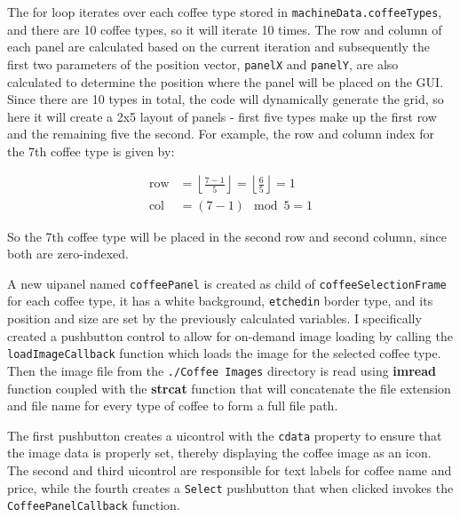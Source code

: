 \documentclass[a4paper, 11pt]{article}
\begin{document}
\noindent The for loop iterates over each coffee type stored in \texttt{machineData.coffeeTypes}, and there are 10 coffee types, so it will iterate 10 times. The row and column of each panel are calculated based on the current iteration and subsequently the first two parameters of the position vector, \texttt{panelX} and \texttt{panelY}, are also calculated to determine the position where the panel will be placed on the GUI. Since there are 10 types in total, the code will dynamically generate the grid, so here it will create a 2x5 layout of panels - first five types make up the first row and the remaining five the second. For example, the row and column index for the 7th coffee type is given by:

\begin{align*}
\text{row} & = \left\lfloor \frac{7 - 1}{5} \right\rfloor = \left\lfloor \frac{6}{5} \right\rfloor = 1 \\
\text{col} & = (7 - 1) \mod 5 = 1
\end{align*}

\noindent So the 7th coffee type will be placed in the second row and second column, since both are zero-indexed.
\vspace{5mm}

\noindent A new uipanel named \texttt{coffeePanel} is created as child of \texttt{coffeeSelectionFrame} for each coffee type, it has a white background, \texttt{etchedin} border type, and its position and size are set by the previously calculated variables.
I specifically created a pushbutton control to allow for on-demand image loading by calling the \texttt{loadImageCallback} function which loads the image for the selected coffee type. Then the image file from the \texttt{./Coffee Images} directory is read using \textbf{imread} function coupled with the \textbf{strcat} function that will concatenate the file extension and file name for every type of coffee to form a full file path.
\vspace{5mm}

\noindent The first pushbutton creates a uicontrol with the \texttt{cdata} property to ensure that the image data is properly set, thereby displaying the coffee image as an icon. The second and third uicontrol are responsible for text labels for coffee name and price, while the fourth creates a \texttt{Select} pushbutton that when clicked invokes the \texttt{CoffeePanelCallback} function.
\end{document}
